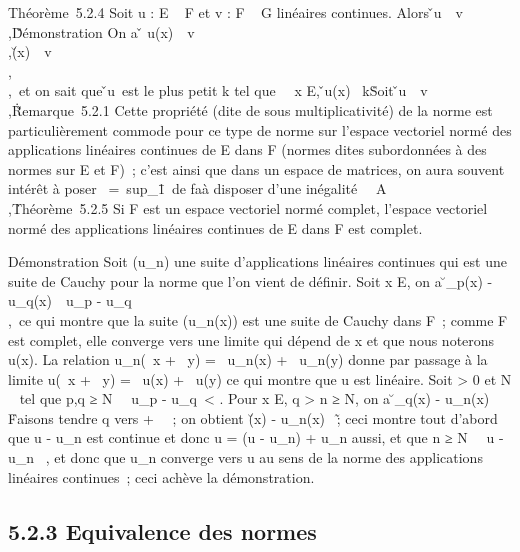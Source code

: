 \documentclass[]{article}
\begin{document}
Théorème~5.2.4 Soit u : E \rightarrow~ F et v : F \rightarrow~ G linéaires continues. Alors
\v \cdot u\
\leq\
v\\,\u\.

Démonstration On a \v \cdot
u(x)\ \leq\
v\\,\u(x)\
\leq\
v\\,\u\\,\x\
et on sait que \v \cdot u\
est le plus petit k tel que \forall~~x \in E,
\v \cdot u(x)\ \leq
k\x\. Soit
\v \cdot u\
\leq\
v\\,\u\.

Remarque~5.2.1 Cette propriété (dite de sous multiplicativité) de la
norme est particulièrement commode pour ce type de norme sur l'espace
vectoriel normé des applications linéaires continues de E dans F (normes
dites subordonnées à des normes sur E et F)~; c'est ainsi que dans un
espace de matrices, on aura souvent intérêt à poser
\A\
=\
sup_\X\=1\AX\
de fa\ccon à disposer d'une inégalité
\AB\
\leq\
A\\,\B\.

Théorème~5.2.5 Si F est un espace vectoriel normé complet, l'espace
vectoriel normé des applications linéaires continues de E dans F est
complet.

Démonstration Soit (u_n) une suite d'applications linéaires
continues qui est une suite de Cauchy pour la norme que l'on vient de
définir. Soit x \in E, on a \u_p(x) -
u_q(x)\ \leq\
u_p -
u_q\\,\x\,
ce qui montre que la suite (u_n(x)) est une suite de Cauchy
dans F~; comme F est complet, elle converge vers une limite qui dépend
de x et que nous noterons u(x). La relation u_n(\alpha~x + \beta~y) =
\alpha~u_n(x) + \beta~u_n(y) donne par passage à la limite u(\alpha~x +
\beta~y) = \alpha~u(x) + \beta~u(y) ce qui montre que u est linéaire. Soit \epsilon
> 0 et N \in \mathbb{N}~ tel que p,q ≥ N \rigtharrow~\
u_p - u_q\ < \epsilon.
Pour x \in E, q > n ≥ N, on a
\u_q(x) -
u_n(x)\ \leq
\epsilon\x\. Faisons tendre q
vers + \infty~~; on obtient \u(x) -
u_n(x)\ \leq
\epsilon\x\~; ceci montre
tout d'abord que u - u_n est continue et donc u = (u -
u_n) + u_n aussi, et que n ≥ N
\rigtharrow~\ u - u_n\ \leq
\epsilon, et donc que u_n converge vers u au sens de la norme des
applications linéaires continues~; ceci achève la démonstration.

\subsection{5.2.3 Equivalence des normes}
\end{document}
